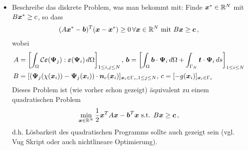 \begin{itemize}
\item Beschreibe das diskrete Problem, was man bekommt mit: Finde $\boldsymbol x^* \in \mathbb{R}^N$ mit $B\boldsymbol x^* \ge c$, so dass
\begin{align*}
	(A\boldsymbol x^* - \boldsymbol b)^T (\boldsymbol x - \boldsymbol x^*) \ge 0 \, \forall \boldsymbol x\in \mathbb{R}^N \text{ mit } B\boldsymbol x \ge \boldsymbol c \, ,
\end{align*}
wobei
\begin{align*}
A &= \left[\int_\Omega \mathcal C \boldsymbol {\varepsilon} (\boldsymbol \Psi_j):\boldsymbol {\varepsilon}(\boldsymbol \Psi_i) \, d\Omega\right]_{1 \le i,j\le N} , \,  \boldsymbol b = \left[ \int_\Omega \boldsymbol b \cdot \boldsymbol\Psi_i \, d\Omega + \int_{\Gamma_N} \boldsymbol t \cdot \boldsymbol\Psi_i \, ds\right]_{1\le i \le N} \\
B & = [(\boldsymbol \Psi_j(\chi(\boldsymbol x_i))-\boldsymbol \Psi_j(\boldsymbol x_i))\cdot \boldsymbol n_c(\boldsymbol x_i)]_{\boldsymbol x_i \in \Gamma_c, 1\le j \le N} , \, c = [-g(\boldsymbol x_i)]_{\boldsymbol x_i \in \Gamma_c}
\end{align*}
Dieses Problem ist (wie vorher schon gezeigt) äquivalent zu einem quadratischen Problem
\begin{align*}
\min_{\boldsymbol x\in \mathbb{R}^N} \frac 1 2 \boldsymbol x^T A \boldsymbol x - \boldsymbol b^T \boldsymbol x \text{ s.t. } B\boldsymbol x \ge \boldsymbol c \, ,
\end{align*}
d.h. Lösbarkeit des quadratischen Programms sollte auch gezeigt sein (vgl. Vug Skript oder auch nichtlineare Optimierung).
\end{itemize}


\newpage

